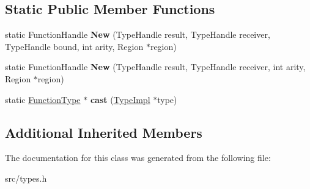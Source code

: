 \subsection*{Static Public Member Functions}
\begin{DoxyCompactItemize}
\item 
\hypertarget{classv8_1_1internal_1_1_type_impl_1_1_function_type_ae1fee4d1c327cc3a56c054e0a323b940}{}static Function\+Handle {\bfseries New} (Type\+Handle result, Type\+Handle receiver, Type\+Handle bound, int arity, Region $\ast$region)\label{classv8_1_1internal_1_1_type_impl_1_1_function_type_ae1fee4d1c327cc3a56c054e0a323b940}

\item 
\hypertarget{classv8_1_1internal_1_1_type_impl_1_1_function_type_a11dc9421057c61d92c63eea361ece576}{}static Function\+Handle {\bfseries New} (Type\+Handle result, Type\+Handle receiver, int arity, Region $\ast$region)\label{classv8_1_1internal_1_1_type_impl_1_1_function_type_a11dc9421057c61d92c63eea361ece576}

\item 
\hypertarget{classv8_1_1internal_1_1_type_impl_1_1_function_type_a749f1bf9c63c3d5e6d2848050252346f}{}static \hyperlink{classv8_1_1internal_1_1_type_impl_1_1_function_type}{Function\+Type} $\ast$ {\bfseries cast} (\hyperlink{classv8_1_1internal_1_1_type_impl}{Type\+Impl} $\ast$type)\label{classv8_1_1internal_1_1_type_impl_1_1_function_type_a749f1bf9c63c3d5e6d2848050252346f}

\end{DoxyCompactItemize}
\subsection*{Additional Inherited Members}


The documentation for this class was generated from the following file\+:\begin{DoxyCompactItemize}
\item 
src/types.\+h\end{DoxyCompactItemize}
